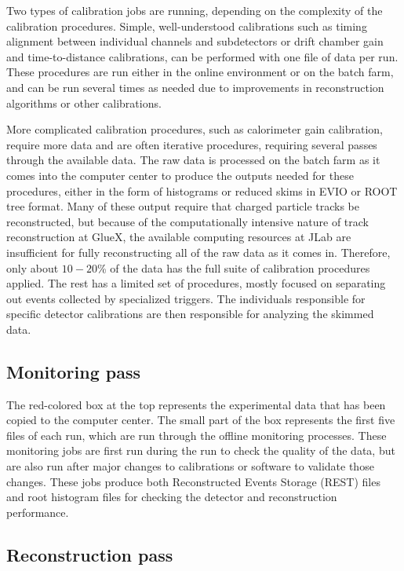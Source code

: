 Two types of calibration jobs are running, depending on the complexity of the calibration procedures.  Simple, well-understood calibrations such as timing alignment between individual channels and subdetectors or drift chamber gain and time-to-distance calibrations, can be performed with one file of data per run.  These procedures are run either in the online environment or on the batch farm, and can be run several times as needed due to improvements in reconstruction algorithms or other calibrations.

More complicated calibration procedures, such as calorimeter gain calibration, require more data and are often iterative procedures, requiring several passes through the available data.  The raw data is processed on the batch farm as it comes into the computer center to produce the outputs needed for these procedures, either in the form of histograms or reduced skims in EVIO or ROOT tree format.  Many of these output require that charged particle tracks be reconstructed, but because of the computationally intensive nature of track reconstruction at GlueX, the available computing resources at JLab are insufficient for fully reconstructing all of the raw data as it comes in.  Therefore, only about $10-20$\% of the data has the full suite of calibration procedures applied.  The rest has a limited set of procedures, mostly focused on separating out events collected by specialized triggers. 
The individuals responsible for specific detector calibrations are then responsible for analyzing the skimmed data.

\subsection{Monitoring pass \label{sec:recmonitoring}}

The red-colored box at the top represents the experimental data that has been copied to the computer center. The small part of the box represents the first five files of each run, which are run through the offline monitoring processes. These monitoring jobs are first run during the run to check the quality of the data, but are also run after major changes to calibrations or software to validate those changes. These jobs produce both Reconstructed Events Storage (REST) files and root histogram files for checking the detector and reconstruction performance.

\subsection{Reconstruction pass \label{sec:recreconstruction}}

